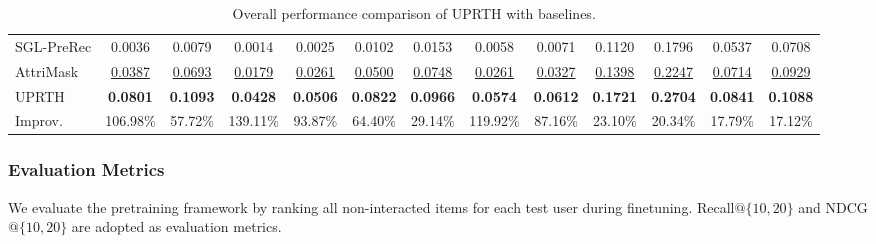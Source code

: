 \begin{table}[!ht]
{\begin{tabular}{l|cccc|cccc|cccc}
SGL-PreRec & 0.0036          & 0.0079          & 0.0014          & 0.0025          & 0.0102          & 0.0153          & 0.0058          & 0.0071          & 0.1120          & 0.1796          & 0.0537          & 0.0708          \\
AttriMask  & \uline{0.0387}    & \uline{0.0693}    & \uline{0.0179}    & \uline{0.0261}    & \uline{0.0500}    & \uline{0.0748}    & \uline{0.0261}    & \uline{0.0327}    & \uline{0.1398}    & \uline{0.2247}    & \uline{0.0714}    & \uline{0.0929}    \\ \hline
UPRTH       & \textbf{0.0801} & \textbf{0.1093} & \textbf{0.0428} & \textbf{0.0506} & \textbf{0.0822} & \textbf{0.0966} & \textbf{0.0574} & \textbf{0.0612} & \textbf{0.1721} & \textbf{0.2704} & \textbf{0.0841} & \textbf{0.1088} \\ \hline
Improv.    & 106.98\%        & 57.72\%         & 139.11\%        & 93.87\%         & 64.40\%         & 29.14\%         & 119.92\%        & 87.16\%         & 23.10\%         & 20.34\%         & 17.79\%         & 17.12\%         \\ \hline
\end{tabular}}
\caption{Overall performance comparison of UPRTH with baselines.}\label{tab_1}
\end{table}

\subsubsection{Evaluation Metrics}
We evaluate the pretraining framework by ranking all non-interacted items for each test user during finetuning. Recall$@ \{10,20\}$ and NDCG$@\{10,20\}$ are adopted as evaluation metrics. 

